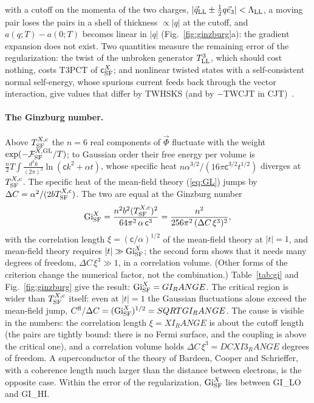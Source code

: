 \documentclass[aps,prd,twocolumn,superscriptaddress,nofootinbib,floatfix,longbibliography]{revtex4-2}
\newcommand{\LL}{{\rm LL}}
\newcommand{\SF}{{\rm SF}}
\begin{document}
with a cutoff on the momenta of the two charges, $|\vec q_\LL\pm\frac12q\vec e_3|<\Lambda_\LL$, a moving pair loses the pairs in a
shell of thickness $\propto|q|$ at the cutoff, and $a(q;T)-a(0;T)$ becomes linear in $|q|$ (Fig.~\ref{fig:ginzburg}a): the
gradient expansion does not exist. Two quantities measure the remaining error of the regularization: the twist of the
unbroken generator $T^3_\LL$, which should cost nothing, costs {{T3PCT}} of $\mathsf c^X_\SF$; and nonlinear twisted
states with a self-consistent normal self-energy, whose spurious current feeds back through the vector interaction, give
values that differ by {{TWHSKS}} (and by $-${{TWCJT}} in CJT)~\cite{SM}.

\paragraph*{The Ginzburg number.}
Above $T^{X,{\rm c}}_\SF$ the $n=6$ real components of $\vec\Phi$ fluctuate with the weight $\exp(-\mathcal F^{X,{\rm GL}}_\SF/T)$; to
Gaussian order their free energy per volume is $\frac n2T\int\frac{d^3k}{(2\pi)^3}\ln(\mathsf c k^2+\alpha t)$, whose specific
heat $n\alpha^{3/2}/(16\pi\mathsf c^{3/2}t^{1/2})$ diverges at $T^{X,{\rm c}}_\SF$. The specific heat of the mean-field theory
(\ref{eq:GL}) jumps by $\Delta C=\alpha^2/(2bT^{X,{\rm c}}_\SF)$. The two are equal at the Ginzburg
number~\cite{Levanyuk1959,Ginzburg1960}
\begin{equation}
{\rm Gi}^X_\SF=\frac{n^2b^2(T^{X,{\rm c}}_\SF)^2}{64\pi^2\,\alpha\,\mathsf c^3}=\frac{n^2}{256\pi^2\,(\Delta C\,\xi^3)^2},
\label{eq:Gi}
\end{equation}
with the correlation length $\xi=(\mathsf c/\alpha)^{1/2}$ of the mean-field theory at $|t|=1$, and mean-field theory requires $|t|\gg{\rm Gi}^X_\SF$; the second form shows that it needs many degrees of freedom,
$\Delta C\,\xi^3\gg1$, in a correlation volume. (Other forms of the criterion change the numerical factor, not the
combination.) Table~\ref{tab:gi} and Fig.~\ref{fig:ginzburg} give the result:
${\rm Gi}^X_\SF={{GI_RANGE}}$. The critical region is wider than $T^{X,{\rm c}}_\SF$ itself: even at $|t|=1$ the Gaussian
fluctuations alone exceed the mean-field jump, $C^{\rm fl}/\Delta C=({\rm Gi}^X_\SF)^{1/2}={{SQRTGI_RANGE}}$. The cause is
visible in the numbers: the correlation length $\xi={{XI_RANGE}}$ is about the cutoff length (the pairs are tightly bound:
there is no Fermi surface, and the coupling is above the critical one), and a correlation volume holds
$\Delta C\,\xi^3={{DCXI3_RANGE}}$ degrees of freedom. A superconductor of the theory of Bardeen, Cooper and Schrieffer, with a
coherence length much larger than the distance between electrons, is the opposite case. Within the error of the
regularization, ${\rm Gi}^X_\SF$ lies between {{GI_LO}} and {{GI_HI}}.
\end{document}
